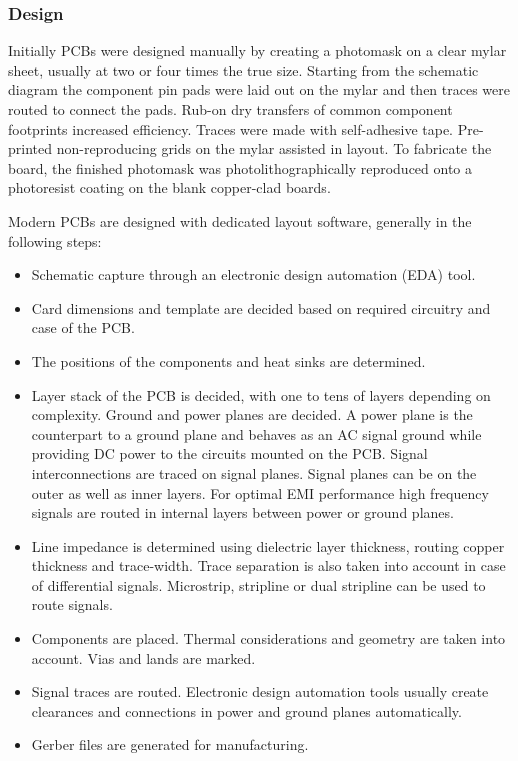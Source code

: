 \documentclass[12pt]{article}
\begin{document}
\subsubsection{Design}
Initially PCBs were designed manually by creating a photomask on a clear mylar sheet, usually at two or four times the true size. Starting from the schematic diagram the component pin pads were laid out on the mylar and then traces were routed to connect the pads. Rub-on dry transfers of common component footprints increased efficiency. Traces were made with self-adhesive tape. Pre-printed non-reproducing grids on the mylar assisted in layout. To fabricate the board, the finished photomask was photolithographically reproduced onto a photoresist coating on the blank copper-clad boards.\par 
 Modern PCBs are designed with dedicated layout software, generally in the following steps:
\begin{itemize}
\item Schematic capture through an electronic design automation (EDA) tool.
\item Card dimensions and template are decided based on required circuitry and case of the PCB.
\item The positions of the components and heat sinks are determined.
\item Layer stack of the PCB is decided, with one to tens of layers depending on complexity. Ground and power planes are decided. A power plane is the counterpart to a ground plane and behaves as an AC signal ground while providing DC power to the circuits mounted on the PCB. Signal interconnections are traced on signal planes. Signal planes can be on the outer as well as inner layers. For optimal EMI performance high frequency signals are routed in internal layers between power or ground planes.
\item Line impedance is determined using dielectric layer thickness, routing copper thickness and trace-width. Trace separation is also taken into account in case of differential signals. Microstrip, stripline or dual stripline can be used to route signals.
\item Components are placed. Thermal considerations and geometry are taken into account. Vias and lands are marked.
\item Signal traces are routed. Electronic design automation tools usually create clearances and connections in power and ground planes automatically.
\item Gerber files are generated for manufacturing.
\end{itemize}
\newpage
\end{document}
